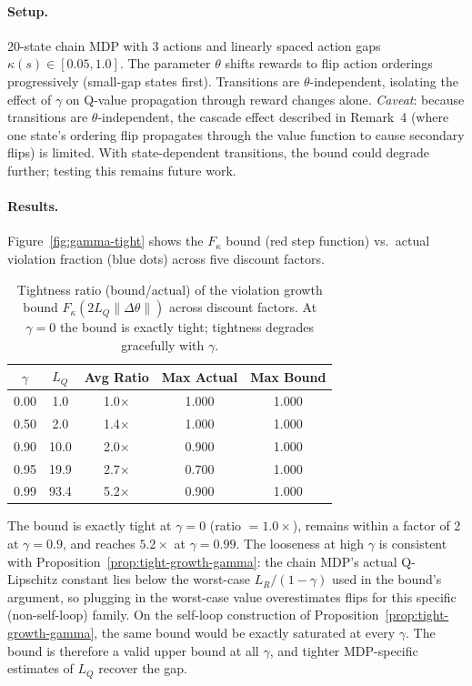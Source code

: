 \documentclass{article}
\begin{document}
\paragraph{Setup.} 20-state chain MDP with 3 actions and linearly spaced action gaps $\kappa(s) \in [0.05, 1.0]$. The parameter $\theta$ shifts rewards to flip action orderings progressively (small-gap states first). Transitions are $\theta$-independent, isolating the effect of $\gamma$ on Q-value propagation through reward changes alone. \emph{Caveat}: because transitions are $\theta$-independent, the cascade effect described in Remark~4 (where one state's ordering flip propagates through the value function to cause secondary flips) is limited. With state-dependent transitions, the bound could degrade further; testing this remains future work.

\paragraph{Results.} Figure~\ref{fig:gamma-tight} shows the $F_\kappa$ bound (red step function) vs.\ actual violation fraction (blue dots) across five discount factors.

\begin{table}[h]
\centering
\caption{Tightness ratio (bound/actual) of the violation growth bound $F_\kappa(2L_Q\|\Delta\theta\|)$ across discount factors. At $\gamma=0$ the bound is exactly tight; tightness degrades gracefully with $\gamma$.}
\label{tab:gamma-tight}
\begin{tabular}{ccccc}
\toprule
$\gamma$ & $L_Q$ & Avg Ratio & Max Actual & Max Bound \\
\midrule
0.00 &  1.0 & 1.0$\times$ & 1.000 & 1.000 \\
0.50 &  2.0 & 1.4$\times$ & 1.000 & 1.000 \\
0.90 & 10.0 & 2.0$\times$ & 0.900 & 1.000 \\
0.95 & 19.9 & 2.7$\times$ & 0.700 & 1.000 \\
0.99 & 93.4 & 5.2$\times$ & 0.900 & 1.000 \\
\bottomrule
\end{tabular}
\end{table}

The bound is exactly tight at $\gamma = 0$ (ratio $= 1.0\times$), remains within a factor of 2 at $\gamma = 0.9$, and reaches $5.2\times$ at $\gamma = 0.99$. The looseness at high $\gamma$ is consistent with Proposition~\ref{prop:tight-growth-gamma}: the chain MDP's actual Q-Lipschitz constant lies below the worst-case $L_R/(1-\gamma)$ used in the bound's argument, so plugging in the worst-case value overestimates flips for this specific (non-self-loop) family. On the self-loop construction of Proposition~\ref{prop:tight-growth-gamma}, the same bound would be exactly saturated at every $\gamma$. The bound is therefore a valid upper bound at all $\gamma$, and tighter MDP-specific estimates of $L_Q$ recover the gap.
\end{document}

